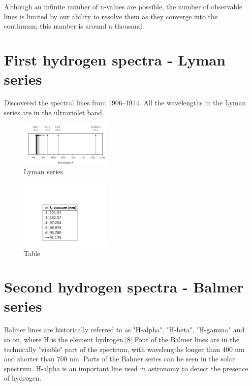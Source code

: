\documentclass{article}
\begin{document}
Although an infinite number of n-values are possible, the number of observable lines is limited by our ability to resolve them as they converge into the continuum; this number is around a thousand.

\section{First hydrogen spectra - Lyman series}

Discovered the spectral lines from 1906–1914. All the wavelengths in the Lyman series are in the ultraviolet band.

\begin{figure}[h]
\begin{center}
\includegraphics[width=0.4\textwidth]{Lyman} %
\caption{Lyman series}
\end{center}
\end{figure}

\begin{figure}[h]
\begin{center}
\includegraphics[width=0.4\textwidth]{lymantable} %
\caption{Table}
\end{center}
\end{figure}


\section{Second hydrogen spectra - Balmer series}

Balmer lines are historically referred to as "H-alpha", "H-beta", "H-gamma" and so on, where H is the element hydrogen.[8] Four of the Balmer lines are in the technically "visible" part of the spectrum, with wavelengths longer than 400 nm and shorter than 700 nm. Parts of the Balmer series can be seen in the solar spectrum. H-alpha is an important line used in astronomy to detect the presence of hydrogen.
\end{document}
